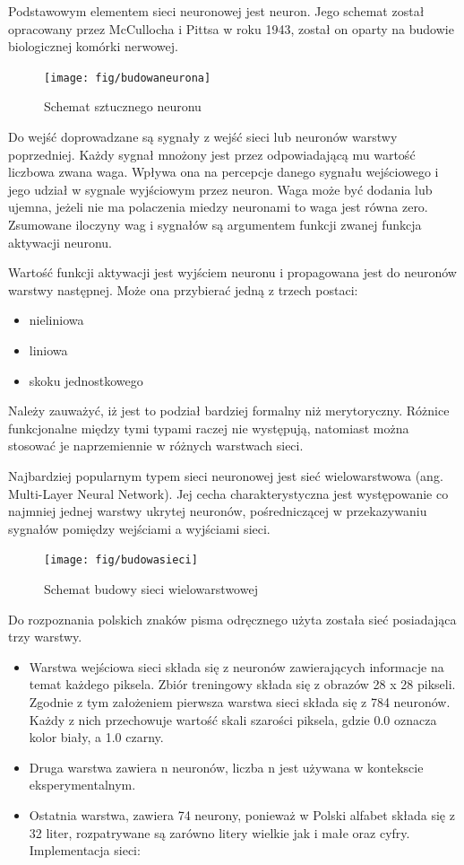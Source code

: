 \documentclass[brudnopis]{xmgr}
\begin{document}
Podstawowym elementem sieci neuronowej jest neuron. Jego schemat został opracowany przez McCullocha i Pittsa w roku 1943, został on oparty na budowie biologicznej komórki nerwowej.

\begin{figure}[!tbh]
\centering
\texttt{[image: fig/budowaneurona]}
\caption{Schemat sztucznego neuronu}
\end{figure}
\newpage

Do wejść doprowadzane są sygnały z wejść sieci lub neuronów warstwy poprzedniej. Każdy sygnał mnożony jest przez odpowiadającą mu wartość liczbowa zwana waga. Wpływa ona na percepcje danego sygnału wejściowego i jego udział w sygnale wyjściowym przez neuron. Waga może być dodania lub ujemna, jeżeli nie ma polaczenia miedzy neuronami to waga jest równa zero. Zsumowane iloczyny wag i sygnałów są argumentem funkcji zwanej funkcja aktywacji neuronu.

Wartość funkcji aktywacji jest wyjściem neuronu i propagowana jest do neuronów warstwy następnej. Może ona przybierać jedną z trzech postaci:
\begin{itemize}
\item
nieliniowa
\item
liniowa
\item
skoku jednostkowego
\end{itemize}

Należy zauważyć, iż jest to podział bardziej formalny niż merytoryczny. Różnice funkcjonalne między tymi typami raczej nie występują, natomiast można stosować je naprzemiennie w różnych warstwach sieci.

Najbardziej popularnym typem sieci neuronowej jest sieć wielowarstwowa (ang. Multi-Layer Neural Network). Jej cecha charakterystyczna jest występowanie co najmniej jednej warstwy ukrytej neuronów, pośredniczącej w przekazywaniu sygnałów pomiędzy wejściami a wyjściami sieci.

\begin{figure}[!tbh]
\centering
\texttt{[image: fig/budowasieci]}
\caption{Schemat budowy sieci wielowarstwowej}
\end{figure}
\newpage

Do rozpoznania polskich znaków pisma odręcznego użyta została sieć posiadająca trzy warstwy.

\begin{itemize}
\item
Warstwa wejściowa sieci składa się z neuronów zawierających informacje na temat każdego piksela. Zbiór treningowy składa się z obrazów 28 x 28 pikseli. Zgodnie z tym założeniem pierwsza warstwa sieci składa się z 784 neuronów. Każdy z nich przechowuje wartość skali szarości piksela, gdzie 0.0 oznacza kolor biały, a 1.0 czarny.
\item
Druga warstwa zawiera n neuronów, liczba n jest używana w kontekscie eksperymentalnym.
\item
Ostatnia warstwa, zawiera 74 neurony, ponieważ w Polski alfabet składa się z 32 liter, rozpatrywane są zarówno litery wielkie jak i małe oraz cyfry. Implementacja sieci:
\end{itemize}
\end{document}
